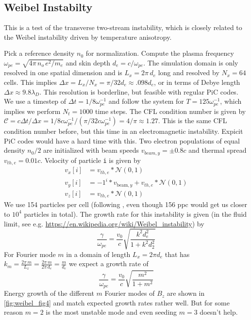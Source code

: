 \documentclass[%
preprint,
amsmath,amssymb,
aps,
]{revtex4-2}
\begin{document}
\subsection{Weibel Instabilty}

This is a test of the transverse two-stream instability, which is closely
related to the Weibel instability driven by temperature anisotropy.

Pick a reference density $n_0$ for normalization. Compute the plasma frequency
$\omega_{pe} = \sqrt{4\pi\,n_o\,e^2/m_e}$ and skin depth $d_e = c/\omega_{pe}$.
The simulation domain is only resolved in one spatial dimension and is $L_x =
2\pi\,d_e$ long and resolved by $N_x = 64$ cells. This implies $\Delta{x} =
L_x/ N_x = \pi/32 d_e \approx .098 d_e$, or in terms of Debye length $\Delta{x}
\approx 9.8 \lambda_D$. This resolution is borderline, but feasible with
regular PiC codes.  We use a timestep of $\Delta{t} = 1/8 \omega_{pe}^{-1}$ and
follow the system for $T = 125 \omega_{pe}^{-1}$, which implies we perform $N_t
= 1000$ time steps. The CFL condition number is given by $\mathcal{C} = c
\Delta{t}/\Delta{x} = 1/8 c \omega_{pe}^{-1} / (\pi/32 c \omega_{pe}^{-1}) =
4/\pi \approx 1.27$. This is the same CFL condition number before, but this
time in an electromagnetic instability. Expicit PiC codes would have a hard
time with this.  Two electron populations of equal density $n_0/2$ are
initialized with beam speeds $v_{beam,y} = \pm 0.8 c$ and thermal spread
$v_{th,e} = 0.01 c$. Velocity of particle \texttt{i} is given by
\begin{align*}
    v_x[i] &= v_{th,e} * \mathcal{N}(0,1) \\
    v_y[i] & = -1^i * v_{\mathrm{beam},y} + v_{th,e} * \mathcal{N}(0,1) \\
    v_z[i] &= v_{th,e} * \mathcal{N}(0,1)
\end{align*}
We use 154 particles per cell (following \cite{LAPENTA2017349}, even though 156
ppc would get us closer to $10^4$ particles in total).  The growth rate for
this instability is given (in the fluid limit, see e.g.
\url{https://en.wikipedia.org/wiki/Weibel_instability}) by
\begin{equation*}
    \frac{\gamma}{\omega_{pe}} =  \frac{v_0}{c} \sqrt{\frac{k^2 d_e^2}{1+k^2 d_2^2}}
\end{equation*}
For Fourier mode $m$ in a domain of length $L_x = 2\pi d_e$ that has $k_m =
\frac{2\pi\,m}{L_x} = \frac{2\pi\,m}{2\pi\, d_e} = \frac{m}{d_e}$ we expect a
growth rate of
\begin{equation*}
    \frac{\gamma}{\omega_{pe}} =  \frac{v_0}{c} \sqrt{\frac{m^2}{1+m^2}}
\end{equation*}
Energy growth of the different $m$ Fourier modes of $B_z$ are shown in
\ref{fig:weibel_fig4} and match expected growth rates rather well. But for some
reason $m=2$ is the most unstable mode and even seeding $m=3$ doesn't help.
\end{document}
